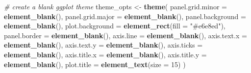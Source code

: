 \documentclass[]{book}
\newenvironment{Shaded}{\begin{snugshade}}{\end{snugshade}}
\newcommand{\KeywordTok}[1]{\textcolor[rgb]{0.13,0.29,0.53}{\textbf{#1}}}
\newcommand{\DataTypeTok}[1]{\textcolor[rgb]{0.13,0.29,0.53}{#1}}
\newcommand{\DecValTok}[1]{\textcolor[rgb]{0.00,0.00,0.81}{#1}}
\newcommand{\StringTok}[1]{\textcolor[rgb]{0.31,0.60,0.02}{#1}}
\newcommand{\CommentTok}[1]{\textcolor[rgb]{0.56,0.35,0.01}{\textit{#1}}}
\newcommand{\NormalTok}[1]{#1}
\theoremstyle{definition}
\theoremstyle{definition}
\theoremstyle{definition}
\theoremstyle{remark}
\begin{document}
\begin{Shaded}
\begin{Highlighting}[]
\CommentTok{# create a blank ggplot theme}
\NormalTok{theme_opts <-}\StringTok{ }\KeywordTok{theme}\NormalTok{(}
  \DataTypeTok{panel.grid.minor =} \KeywordTok{element_blank}\NormalTok{(),}
  \DataTypeTok{panel.grid.major =} \KeywordTok{element_blank}\NormalTok{(),}
  \DataTypeTok{panel.background =} \KeywordTok{element_blank}\NormalTok{(),}
  \DataTypeTok{plot.background =} \KeywordTok{element_rect}\NormalTok{(}\DataTypeTok{fill =} \StringTok{"#e6e8ed"}\NormalTok{),}
  \DataTypeTok{panel.border =} \KeywordTok{element_blank}\NormalTok{(),}
  \DataTypeTok{axis.line =} \KeywordTok{element_blank}\NormalTok{(),}
  \DataTypeTok{axis.text.x =} \KeywordTok{element_blank}\NormalTok{(),}
  \DataTypeTok{axis.text.y =} \KeywordTok{element_blank}\NormalTok{(),}
  \DataTypeTok{axis.ticks =} \KeywordTok{element_blank}\NormalTok{(),}
  \DataTypeTok{axis.title.x =} \KeywordTok{element_blank}\NormalTok{(),}
  \DataTypeTok{axis.title.y =} \KeywordTok{element_blank}\NormalTok{(),}
  \DataTypeTok{plot.title =} \KeywordTok{element_text}\NormalTok{(}\DataTypeTok{size =} \DecValTok{15}\NormalTok{)}
\NormalTok{)}



\end{Highlighting}
\end{Shaded}
\end{document}
